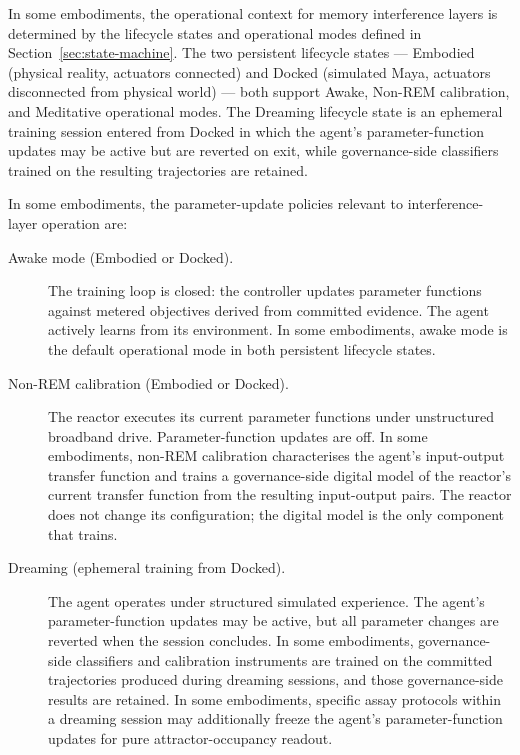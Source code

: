 \documentclass[a4paper,12pt]{article}
\begin{document}
In some embodiments, the operational context for memory interference
layers is determined by the lifecycle states and operational modes
defined in Section~\ref{sec:state-machine}. The two persistent
lifecycle states --- Embodied (physical reality, actuators connected)
and Docked (simulated Maya, actuators disconnected from physical
world) --- both support Awake, Non-REM calibration, and Meditative
operational modes. The Dreaming lifecycle state is an ephemeral
training session entered from Docked in which the agent's
parameter-function updates may be active but are reverted on exit,
while governance-side classifiers trained on the resulting trajectories
are retained.

In some embodiments, the parameter-update policies relevant to
interference-layer operation are:

\begin{description}
  \item[Awake mode (Embodied or Docked).] The training loop is closed:
    the controller updates parameter functions against metered
    objectives derived from committed evidence. The agent actively
    learns from its environment. In some embodiments, awake mode is
    the default operational mode in both persistent lifecycle states.
  \item[Non-REM calibration (Embodied or Docked).] The reactor
    executes its current parameter functions under unstructured
    broadband drive. Parameter-function updates are off. In some
    embodiments, non-REM calibration characterises the agent's
    input-output transfer function and trains a governance-side
    digital model of the reactor's current transfer function from the
    resulting input-output pairs. The reactor does not change its
    configuration; the digital model is the only component that
    trains.
  \item[Dreaming (ephemeral training from Docked).] The agent
    operates under structured simulated experience. The agent's
    parameter-function updates may be active, but all parameter
    changes are reverted when the session concludes. In some
    embodiments, governance-side classifiers and calibration
    instruments are trained on the committed trajectories produced
    during dreaming sessions, and those governance-side results are
    retained. In some embodiments, specific assay protocols within a
    dreaming session may additionally freeze the agent's
    parameter-function updates for pure attractor-occupancy readout.
\end{description}
\end{document}
